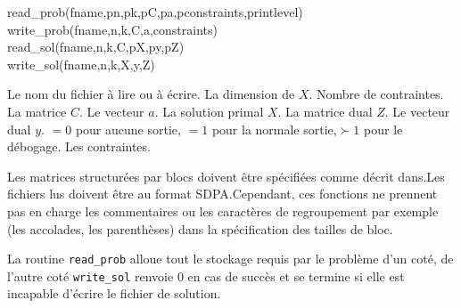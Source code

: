 \begin{itemize}
    
read\_prob(fname,pn,pk,pC,pa,pconstraints,printlevel)\\
write\_prob(fname,n,k,C,a,constraints)\\
read\_sol(fname,n,k,C,pX,py,pZ)\\
write\_sol(fname,n,k,X,y,Z)

    
    
    \begin{itemize}
         Le nom du fichier à lire ou à écrire.
         La dimension de $X$.
          Nombre de contraintes.
         La matrice $C$.
         Le vecteur $a$.
         La solution primal $X$.
         La matrice dual $Z$.
         Le vecteur dual $y$.
         $= 0$ pour aucune sortie, $= 1$ pour la normale
                      sortie,$\succ 1$ pour le débogage.
         Les contraintes. 
                      
                      
                      
        
        
    \end{itemize}
    
    
    Les matrices structurées par blocs doivent être spécifiées comme décrit dans\cite{Borchers.B:}.Les fichiers lus doivent être au format SDPA\cite{SDPA}.Cependant, ces fonctions ne prennent pas en charge les commentaires ou les caractères de regroupement par exemple (les accolades, les parenthèses) dans la spécification des tailles de bloc.
    
    
    La routine {\tt read\_prob} alloue tout le stockage requis par le problème d’un coté, de l’autre coté {\tt write\_sol}  renvoie 0 en cas de succès et se termine si elle est incapable d’écrire le fichier de solution. 
    
\end{itemize}

